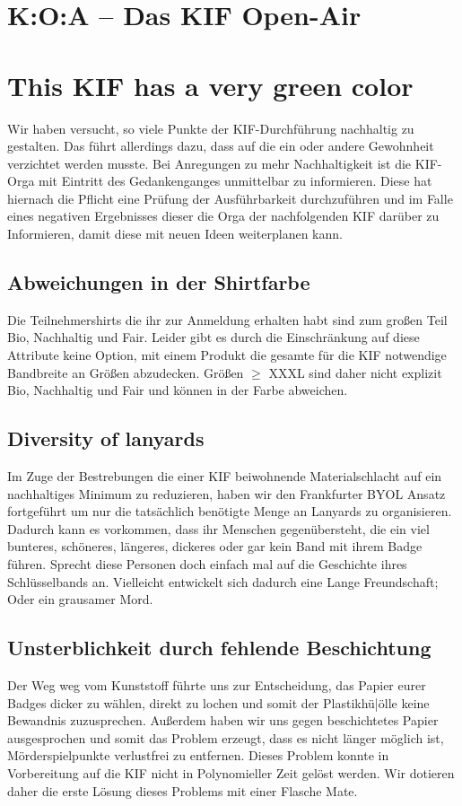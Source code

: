 \section*{K:O:A -- Das KIF Open-Air}



\section*{This KIF has a very green color}
Wir haben versucht, so viele Punkte der KIF-Durchführung nachhaltig zu gestalten. Das führt
allerdings dazu, dass auf die ein oder andere Gewohnheit verzichtet werden musste. Bei Anregungen
zu mehr Nachhaltigkeit ist die KIF-Orga mit Eintritt des Gedankenganges unmittelbar zu informieren.
Diese hat hiernach die Pflicht eine Prüfung der Ausführbarkeit durchzuführen und im Falle eines
negativen Ergebnisses dieser die Orga der nachfolgenden KIF darüber zu Informieren, damit diese mit
neuen Ideen weiterplanen kann.

\subsection*{Abweichungen in der Shirtfarbe}
Die Teilnehmershirts die ihr zur Anmeldung erhalten habt sind zum großen Teil Bio, Nachhaltig und
Fair. Leider gibt es durch die Einschränkung auf diese Attribute keine Option, mit einem Produkt die
gesamte für die KIF notwendige Bandbreite an Größen abzudecken. Größen $\geq$ XXXL sind daher nicht
explizit Bio, Nachhaltig und Fair und können in der Farbe abweichen.

\subsection*{Diversity of lanyards}
Im Zuge der Bestrebungen die einer KIF beiwohnende Materialschlacht auf ein nachhaltiges Minimum zu
reduzieren, haben wir den Frankfurter BYOL Ansatz fortgeführt um nur die tatsächlich benötigte Menge
an Lanyards zu organisieren. Dadurch kann es vorkommen, dass ihr Menschen gegenübersteht, die ein
viel bunteres, schöneres, längeres, dickeres oder gar kein Band mit ihrem Badge führen. Sprecht
diese Personen doch einfach mal auf die Geschichte ihres Schlüsselbands an. Vielleicht entwickelt
sich dadurch eine Lange Freundschaft; Oder ein grausamer Mord.

\subsection*{Unsterblichkeit durch fehlende Beschichtung}
Der Weg weg vom Kunststoff führte uns zur Entscheidung, das Papier eurer Badges dicker zu wählen,
direkt zu lochen und somit der Plastikh{ü|ö}lle keine Bewandnis zuzusprechen. Außerdem haben wir uns
gegen beschichtetes Papier ausgesprochen und somit das Problem erzeugt, dass es nicht länger möglich
ist, Mörderspielpunkte verlustfrei zu entfernen. Dieses Problem konnte in Vorbereitung auf die KIF
nicht in Polynomieller Zeit gelöst werden. Wir dotieren daher die erste Lösung dieses Problems mit
einer Flasche Mate.

